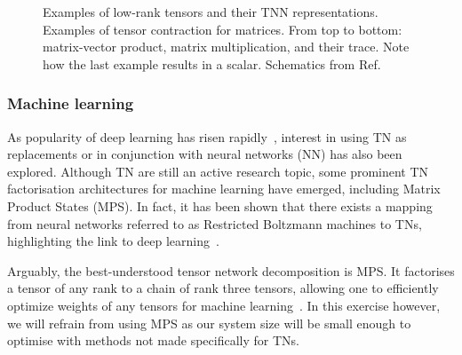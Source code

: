 \begin{figure}[htb]
    \centering
     \qquad
    
    \caption{\protect{} Examples of low-rank tensors and their TNN representations. \protect{} Examples of tensor contraction for matrices. From top to bottom: matrix-vector product, matrix multiplication, and their trace. Note how the last example results in a scalar. Schematics from Ref.~\cite{Stoudenmire2021}}
    \label{fig:tensor_diagrams}
\end{figure}


\subsubsection{Machine learning}

As popularity of deep learning has risen rapidly~\cite{DL_review}, interest in using TN as replacements or in conjunction with neural networks (NN) has also been explored.
Although TN are still an active research topic, some prominent TN factorisation architectures for machine learning have emerged, including Matrix Product States (MPS). %
In fact, it has been shown that there exists a mapping from neural networks referred to as Restricted Boltzmann machines to TNs, highlighting the link to deep learning~\cite{PhysRevB.97.085104}.

Arguably, the best-understood tensor network decomposition is MPS. It factorises a tensor of any rank to a chain of rank three tensors, allowing one to efficiently optimize weights of any tensors for machine learning~\cite{Bridgeman_2017}. In this exercise however, we will refrain from using MPS as our system size will be small enough to optimise with methods not made specifically for TNs.



